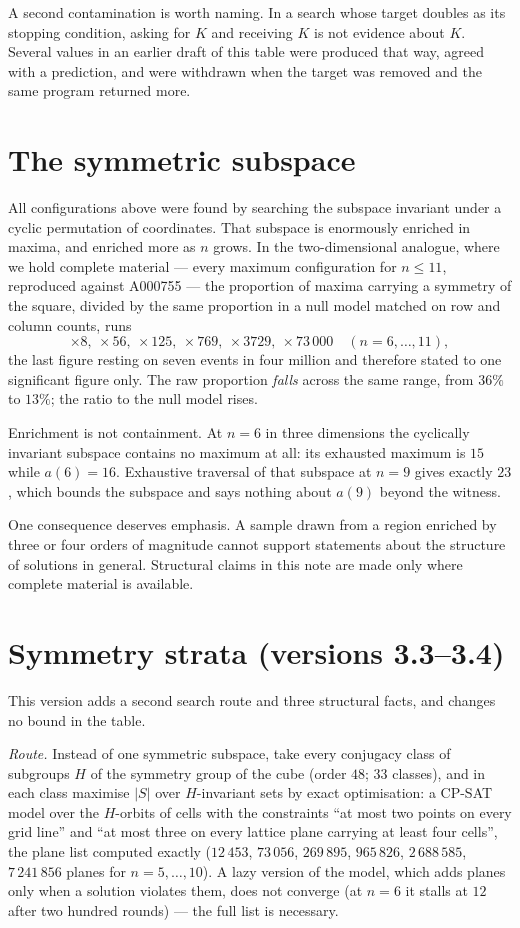 \documentclass[11pt,a4paper]{article}
\begin{document}
A second contamination is worth naming.  In a search whose target doubles as its stopping
condition, asking for $K$ and receiving $K$ is not evidence about $K$.  Several values in an
earlier draft of this table were produced that way, agreed with a prediction, and were withdrawn
when the target was removed and the same program returned more.

\section{The symmetric subspace}\label{s:subspace}
All configurations above were found by searching the subspace invariant under a cyclic
permutation of coordinates.  That subspace is enormously enriched in maxima, and enriched more
as $n$ grows.  In the two-dimensional analogue, where we hold complete material --- every maximum
configuration for $n\le11$, reproduced against A000755 --- the proportion of maxima carrying a
symmetry of the square, divided by the same proportion in a null model matched on row and column
counts, runs
\[\times8,\ \times56,\ \times125,\ \times769,\ \times3729,\ \times73\,000\quad (n=6,\dots,11),\]
the last figure resting on seven events in four million and therefore stated to one significant
figure only.  The raw proportion \emph{falls} across the same range, from $36\%$ to $13\%$; the
ratio to the null model rises.

Enrichment is not containment.  At $n=6$ in three dimensions the cyclically invariant subspace
contains no maximum at all: its exhausted maximum is $15$ while $a(6)=16$.  Exhaustive traversal
of that subspace at $n=9$ gives exactly $23$, which bounds the subspace and says nothing about
$a(9)$ beyond the witness.

One consequence deserves emphasis.  A sample drawn from a region enriched by three or four orders
of magnitude cannot support statements about the structure of solutions in general.  Structural
claims in this note are made only where complete material is available.

\section{Symmetry strata (versions 3.3--3.4)}\label{s:strata}
This version adds a second search route and three structural facts, and changes no bound in the
table.

\emph{Route.}  Instead of one symmetric subspace, take every conjugacy class of subgroups $H$
of the symmetry group of the cube (order $48$; $33$ classes), and in each class maximise $|S|$
over $H$-invariant sets by exact optimisation: a CP-SAT model over the $H$-orbits of cells with the
constraints ``at most two points on every grid line'' and ``at most three on every lattice plane
carrying at least four cells'', the plane list computed exactly ($12\,453$, $73\,056$, $269\,895$,
$965\,826$, $2\,688\,585$, $7\,241\,856$ planes for $n=5,\dots,10$).  A lazy version of the model,
which adds planes only when a solution violates them, does not converge (at $n=6$ it stalls at $12$
after two hundred rounds) --- the full list is necessary.
\end{document}
